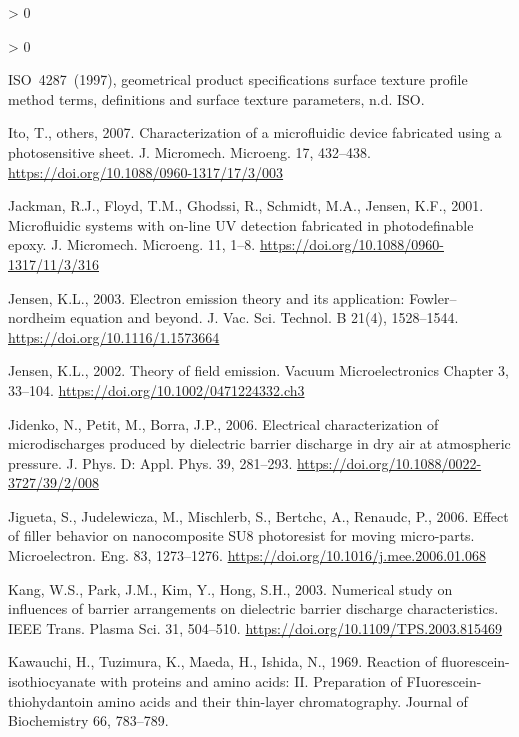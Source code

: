 \documentclass[
  11pt,
  twoside]{article}
\newlength{\cslhangindent}
\newenvironment{CSLReferences}[2] %
 {%
  \setlength{\parindent}{0pt}
  \ifodd #1 \everypar{\setlength{\hangindent}{\cslhangindent}}\ignorespaces\fi
  \ifnum #2 > 0
  \setlength{\parskip}{#2\baselineskip}
  \fi
 }%
 {}
\begin{document}
\begin{CSLReferences}{1}{0}
\begin{CSLReferences}{1}{0}
\leavevmode\hypertarget{ref-ISO4287}{}%
{ISO}~4287~(1997), geometrical product specifications surface texture profile method terms, definitions and surface texture parameters, n.d. ISO.

\leavevmode\hypertarget{ref-Ito07}{}%
Ito, T., others, 2007. Characterization of a microfluidic device fabricated using a photosensitive sheet. J. Micromech. Microeng. 17, 432--438. \url{https://doi.org/10.1088/0960-1317/17/3/003}

\leavevmode\hypertarget{ref-Jack01}{}%
Jackman, R.J., Floyd, T.M., Ghodssi, R., Schmidt, M.A., Jensen, K.F., 2001. Microfluidic systems with on-line UV detection fabricated in photodefinable epoxy. J. Micromech. Microeng. 11, 1--8. \url{https://doi.org/10.1088/0960-1317/11/3/316}

\leavevmode\hypertarget{ref-Jens03}{}%
Jensen, K.L., 2003. Electron emission theory and its application: Fowler--nordheim equation and beyond. J. Vac. Sci. Technol. B 21(4), 1528--1544. \url{https://doi.org/10.1116/1.1573664}

\leavevmode\hypertarget{ref-Jens02}{}%
Jensen, K.L., 2002. Theory of field emission. Vacuum Microelectronics Chapter 3, 33--104. \url{https://doi.org/10.1002/0471224332.ch3}

\leavevmode\hypertarget{ref-Jide06}{}%
Jidenko, N., Petit, M., Borra, J.P., 2006. Electrical characterization of microdischarges produced by dielectric barrier discharge in dry air at atmospheric pressure. J. Phys. D: Appl. Phys. 39, 281--293. \url{https://doi.org/10.1088/0022-3727/39/2/008}

\leavevmode\hypertarget{ref-Jigu06}{}%
Jigueta, S., Judelewicza, M., Mischlerb, S., Bertchc, A., Renaudc, P., 2006. Effect of filler behavior on nanocomposite {SU8} photoresist for moving micro-parts. Microelectron. Eng. 83, 1273--1276. \url{https://doi.org/10.1016/j.mee.2006.01.068}

\leavevmode\hypertarget{ref-Kang03}{}%
Kang, W.S., Park, J.M., Kim, Y., Hong, S.H., 2003. Numerical study on influences of barrier arrangements on dielectric barrier discharge characteristics. IEEE Trans. Plasma Sci. 31, 504--510. \url{https://doi.org/10.1109/TPS.2003.815469}

\leavevmode\hypertarget{ref-Kawa1969}{}%
Kawauchi, H., Tuzimura, K., Maeda, H., Ishida, N., 1969. Reaction of fluorescein-isothiocyanate with proteins and amino acids: {II.} Preparation of FIuorescein-thiohydantoin amino acids and their thin-layer chromatography. Journal of Biochemistry 66, 783--789.


\end{CSLReferences}
\end{CSLReferences}
\end{document}
